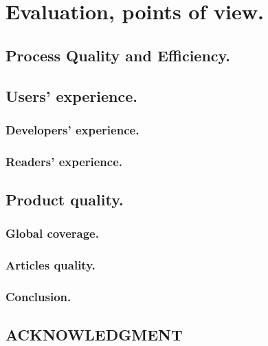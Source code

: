 \documentclass{report}
\begin{document}
\chapter{Evaluation, points of view.}
\label{cha:Evaluation}


\section{Process Quality and Efficiency.}
\label{subsec:processquality}


\section{Users' experience.}
\label{sec:usersexperience}


\subsection{Developers' experience.}


\subsection{Readers' experience.}


\section{Product quality.}
\label{sec:productquality}


\subsection{Global coverage.}


\subsection{Articles quality.}


\subsection{Conclusion.}



\section*{ACKNOWLEDGMENT}%



\end{document}
